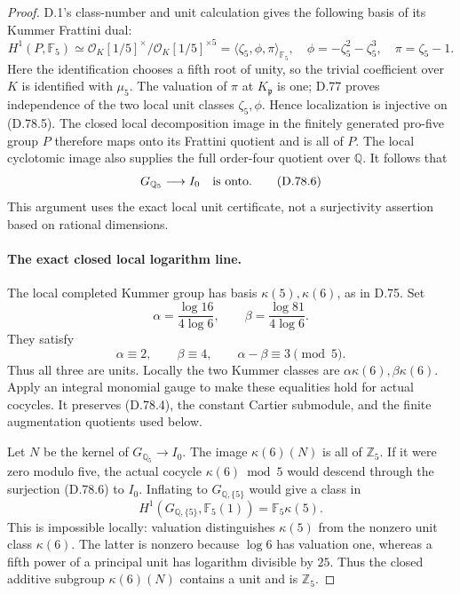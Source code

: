 \begin{proof}
D.1's class-number and unit calculation gives the following
basis of its Kummer Frattini dual:
\[
 H^1(P,\mathbb F_5)
  \simeq\mathcal O_K[1/5]^\times/
                    \mathcal O_K[1/5]^{\times5}
  =\langle\zeta_5,\phi,\pi\rangle_{\mathbb F_5},
 \quad \phi=-\zeta_5^2-\zeta_5^3,\quad \pi=\zeta_5-1.
                                                               \tag{D.78.5}
\]
Here the identification chooses a fifth root of unity, so the
trivial coefficient over \(K\) is identified with \(\mu_5\).
The valuation of \(\pi\) at \(K_{\mathfrak p}\) is one; D.77
proves independence of the two local unit classes
\(\zeta_5,\phi\). Hence localization is injective on (D.78.5).
The closed local decomposition image in the finitely generated
pro-five group \(P\) therefore maps onto its Frattini quotient
and is all of \(P\). The local cyclotomic image also supplies
the full order-four quotient over \(\mathbb Q\).
It follows that
\[
                G_{\mathbb Q_5}\longrightarrow I_0
                         \quad\hbox{is onto}.           \tag{D.78.6}
\]
This argument uses the exact local unit certificate, not a
surjectivity assertion based on rational dimensions.

\paragraph{The exact closed local logarithm line.}
The local completed Kummer group has basis
\(\kappa(5),\kappa(6)\), as in D.75. Set
\[
 \alpha=\frac{\log16}{4\log6},\qquad
 \beta=\frac{\log81}{4\log6}.
                                                               \tag{D.78.7}
\]
They satisfy
\[
 \alpha\equiv2,\qquad \beta\equiv4,\qquad
                    \alpha-\beta\equiv3\pmod5.
                                                               \tag{D.78.8}
\]
Thus all three are units. Locally the two Kummer classes are
\(\alpha\kappa(6),\beta\kappa(6)\). Apply an integral monomial
gauge to make these equalities hold for actual cocycles.
It preserves (D.78.4), the constant Cartier submodule, and the
finite augmentation quotients used below.

Let \(N\) be the kernel of \(G_{\mathbb Q_5}\to I_0\).
The image \(\kappa(6)(N)\) is all of \(\mathbb Z_5\).
If it were zero modulo five, the actual cocycle
\(\kappa(6)\bmod5\) would descend through the surjection
(D.78.6) to \(I_0\). Inflating to \(G_{\mathbb Q,\{5\}}\)
would give a class in
\[
 H^1(G_{\mathbb Q,\{5\}},\mathbb F_5(1))
                       =\mathbb F_5\kappa(5).
 \]
This is impossible locally: valuation distinguishes
\(\kappa(5)\) from the nonzero unit class \(\kappa(6)\).
The latter is nonzero because \(\log6\) has valuation one,
whereas a fifth power of a principal unit has logarithm
divisible by \(25\). Thus the closed additive subgroup
\(\kappa(6)(N)\) contains a unit and is \(\mathbb Z_5\).


\end{proof}
